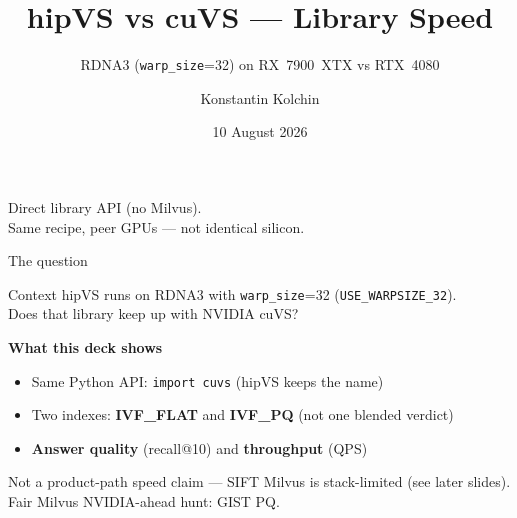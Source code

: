 \documentclass[aspectratio=169,11pt]{beamer}
\title{hipVS vs cuVS --- Library Speed}
\subtitle{RDNA3 (\texttt{warp\_size}=32) on RX~7900~XTX vs RTX~4080}
\author{Konstantin Kolchin}
\date{10 August 2026}
\begin{document}
\begin{frame}
  \titlepage
  \vspace{0.3em}
  \begin{center}
    \small
    Direct library API (no Milvus).\\
    Same recipe, peer GPUs --- not identical silicon.
  \end{center}
\end{frame}

\begin{frame}{The question}
  \begin{block}{Context}
    hipVS runs on RDNA3 with \texttt{warp\_size}=32
    (\texttt{USE\_WARPSIZE\_32}).\\
    Does that library keep up with NVIDIA cuVS?
  \end{block}

  \vspace{0.6em}
  \textbf{What this deck shows}
  \begin{itemize}
    \item Same Python API: \texttt{import cuvs} (hipVS keeps the name)
    \item Two indexes: \textbf{IVF\_FLAT} and \textbf{IVF\_PQ} (not one blended verdict)
    \item \textbf{Answer quality} (recall@10) and \textbf{throughput} (QPS)
  \end{itemize}

  \vspace{0.5em}
  {\footnotesize Not a product-path speed claim --- SIFT Milvus is stack-limited
  (see later slides). Fair Milvus NVIDIA-ahead hunt: GIST PQ.}
\end{frame}
\end{document}
